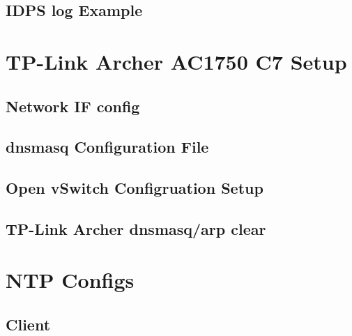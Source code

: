 \documentclass[12pt, oneside]{book}
\begin{document}
\subsection{IDPS log Example}



\section{TP-Link Archer AC1750 C7 Setup}
\subsection{Network IF config}

\subsection{dnsmasq Configuration File}

\subsection{Open vSwitch Configruation Setup}

\subsection{TP-Link Archer dnsmasq/arp clear}


\section{NTP Configs}
\subsection{Client}

\end{document}
